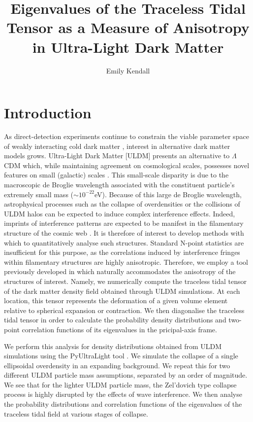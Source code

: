 \documentclass[a4paper,11pt]{article}
\title{\boldmath Eigenvalues of the Traceless Tidal Tensor as a Measure of Anisotropy in Ultra-Light Dark Matter}
\author[a]{Emily Kendall}
\affiliation[a]{The University of Auckland, Private Bag 92019\\
Auckland 1142, New Zealand}
\begin{document}
\maketitle
\flushbottom

\section{Introduction}
\label{sec:intro}

As direct-detection experiments continue to constrain the viable parameter space of weakly interacting cold dark matter \cite{Schumann:2019eaa}, interest in alternative dark matter models grows. Ultra-Light Dark Matter [ULDM] presents an alternative to $\Lambda$CDM which, while maintaining agreement on cosmological scales, possesses novel features on small (galactic) scales \cite{Hui:2016ltb}. This small-scale disparity is due to the macroscopic de Broglie wavelength associated with the constituent particle's extremely small mass ($\sim10^{-22}$eV). Because of this large de Broglie wavelength, astrophysical processes such as the collapse of overdensities or the collisions of ULDM halos can be expected to induce complex interference effects. Indeed, imprints of interference patterns are expected to be manifest in the filamentary structure of the cosmic web \cite{Mocz:2019emo}. It is therefore of interest to develop methods with which to quantitatively analyse such structures. Standard N-point statistics are insufficient for this purpose, as the correlations induced by interference fringes within filamentary structures are highly anisotropic. Therefore, we employ a tool previously developed in \cite{Lee:2009uv} which naturally accommodates the anisotropy of the structures of interest. Namely, we numerically compute the traceless tidal tensor of the dark matter density field obtained through ULDM simulations. At each location, this tensor represents the deformation of a given volume element relative to spherical expansion or contraction. We then diagonalise the traceless tidal tensor in order to calculate the probability density distributions and two-point correlation functions of its eigenvalues in the pricipal-axis frame. 

We perform this analysis for density distributions obtained from ULDM simulations using the {\sc PyUltraLight} tool \cite{Edwards:2018ccc}. We simulate the collapse of a single ellipsoidal overdensity in an expanding background. We repeat this for two different ULDM particle mass assumptions, separated by an order of magnitude. We see that for the lighter ULDM particle mass, the Zel'dovich type collapse process is highly disrupted by the effects of wave interference. We then analyse the probability distributions and correlation functions of the eigenvalues of the traceless tidal field at various stages of collapse.
\end{document}
